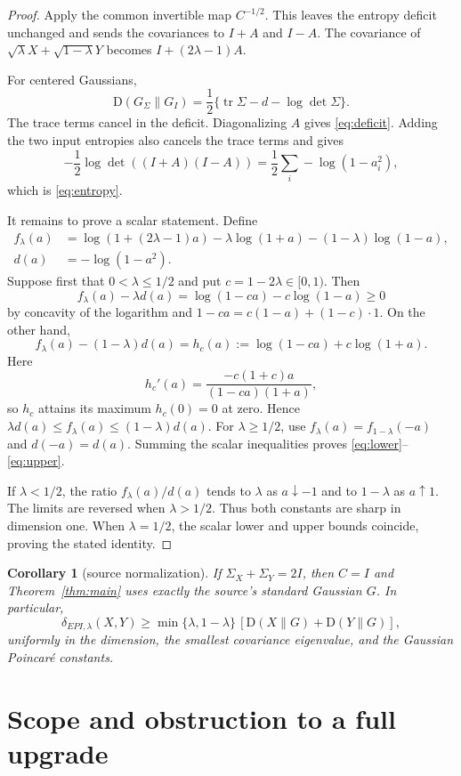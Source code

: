 \documentclass[11pt]{article}
\newtheorem{corollary}{Corollary}
\newcommand{\D}{\mathrm D}
\begin{document}
\begin{proof}
Apply the common invertible map $C^{-1/2}$.  This leaves the entropy deficit
unchanged and sends the covariances to $I+A$ and $I-A$.  The covariance of
$\sqrt\lambda X+\sqrt{1-\lambda}Y$ becomes
$I+(2\lambda-1)A$.

For centered Gaussians,
\[
 \D(G_\Sigma\|G_I)
 =\frac12\{\operatorname{tr}\Sigma-d-\log\det\Sigma\}.
\]
The trace terms cancel in the deficit.  Diagonalizing $A$ gives
\eqref{eq:deficit}.  Adding the two input entropies also cancels the trace
terms and gives
\[
 -\frac12\log\det((I+A)(I-A))
 =\frac12\sum_i-\log(1-a_i^2),
\]
which is \eqref{eq:entropy}.

It remains to prove a scalar statement.  Define
\begin{align*}
 f_\lambda(a)&=\log(1+(2\lambda-1)a)
 -\lambda\log(1+a)-(1-\lambda)\log(1-a),\\
 d(a)&=-\log(1-a^2).
\end{align*}
Suppose first that $0<\lambda\leq1/2$ and put $c=1-2\lambda\in[0,1)$.
Then
\[
 f_\lambda(a)-\lambda d(a)
 =\log(1-ca)-c\log(1-a)\geq0
\]
by concavity of the logarithm and
$1-ca=c(1-a)+(1-c)\cdot1$.  On the other hand,
\[
 f_\lambda(a)-(1-\lambda)d(a)
 =h_c(a):=\log(1-ca)+c\log(1+a).
\]
Here
\[
 h_c'(a)=\frac{-c(1+c)a}{(1-ca)(1+a)},
\]
so $h_c$ attains its maximum $h_c(0)=0$ at zero.  Hence
$\lambda d(a)\leq f_\lambda(a)\leq(1-\lambda)d(a)$.
For $\lambda\geq1/2$, use
$f_\lambda(a)=f_{1-\lambda}(-a)$ and $d(-a)=d(a)$.  Summing the scalar
inequalities proves \eqref{eq:lower}--\eqref{eq:upper}.

If $\lambda<1/2$, the ratio $f_\lambda(a)/d(a)$ tends to $\lambda$ as
$a\downarrow-1$ and to $1-\lambda$ as $a\uparrow1$.  The limits are reversed
when $\lambda>1/2$.  Thus both constants are sharp in dimension one.  When
$\lambda=1/2$, the scalar lower and upper bounds coincide, proving the stated
identity.
\end{proof}

\begin{corollary}[source normalization]
If $\Sigma_X+\Sigma_Y=2I$, then $C=I$ and Theorem~\ref{thm:main} uses exactly
the source's standard Gaussian $G$.  In particular,
\[
 \delta_{EPI,\lambda}(X,Y)\geq
 \min\{\lambda,1-\lambda\}\,[\D(X\|G)+\D(Y\|G)],
\]
uniformly in the dimension, the smallest covariance eigenvalue, and the
Gaussian Poincar\'e constants.
\end{corollary}

\section{Scope and obstruction to a full upgrade}
\end{document}
